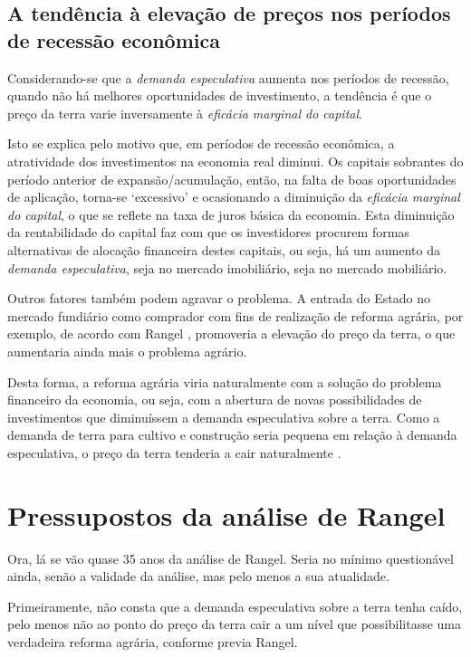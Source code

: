 \documentclass[
	12pt,				%
	oneside,			%
	a4paper,			%
	chapter=TITLE,		%
	section=TITLE,		%
	english,			%
	brazil				%
	]{abntex2}
\begin{document}
\subsection{A tendência à elevação de preços nos períodos de recessão
econômica}\label{a-tenduxeancia-uxe0-elevauxe7uxe3o-de-preuxe7os-nos-peruxedodos-de-recessuxe3o-econuxf4mica}

Considerando-se que a \emph{demanda especulativa} aumenta nos períodos
de recessão, quando não há melhores oportunidades de investimento, a
tendência é que o preço da terra varie inversamente à \emph{eficácia
marginal do capital}.

Isto se explica pelo motivo que, em períodos de recessão econômica, a
atratividade dos investimentos na economia real diminui. Os capitais
sobrantes do período anterior de expansão/acumulação, então, na falta de
boas oportunidades de aplicação, torna-se `excessivo' e ocasionando a
diminuição da \emph{eficácia marginal do capital}, o que se reflete na
taxa de juros básica da economia. Esta diminuição da rentabilidade do
capital faz com que os investidores procurem formas alternativas de
alocação financeira destes capitais, ou seja, há um aumento da
\emph{demanda especulativa}, seja no mercado imobiliário, seja no
mercado mobiliário.

Outros fatores também podem agravar o problema. A entrada do Estado no
mercado fundiário como comprador com fins de realização de reforma
agrária, por exemplo, de acordo com Rangel \autocite*[128]{rangel1985},
promoveria a elevação do preço da terra, o que aumentaria ainda mais o
problema agrário.

Desta forma, a reforma agrária viria naturalmente com a solução do
problema financeiro da economia, ou seja, com a abertura de novas
possibilidades de investimentos que diminuíssem a demanda especulativa
sobre a terra. Como a demanda de terra para cultivo e construção seria
pequena em relação à demanda especulativa, o preço da terra tenderia a
cair naturalmente \autocite[139]{rangel1986b}.

\section{Pressupostos da análise de
Rangel}\label{pressupostos-da-anuxe1lise-de-rangel}

Ora, lá se vão quase 35 anos da análise de Rangel. Seria no mínimo
questionável ainda, senão a validade da análise, mas pelo menos a sua
atualidade.

Primeiramente, não consta que a demanda especulativa sobre a terra tenha
caído, pelo menos não ao ponto do preço da terra cair a um nível que
possibilitasse uma verdadeira reforma agrária, conforme previa Rangel.
\end{document}
